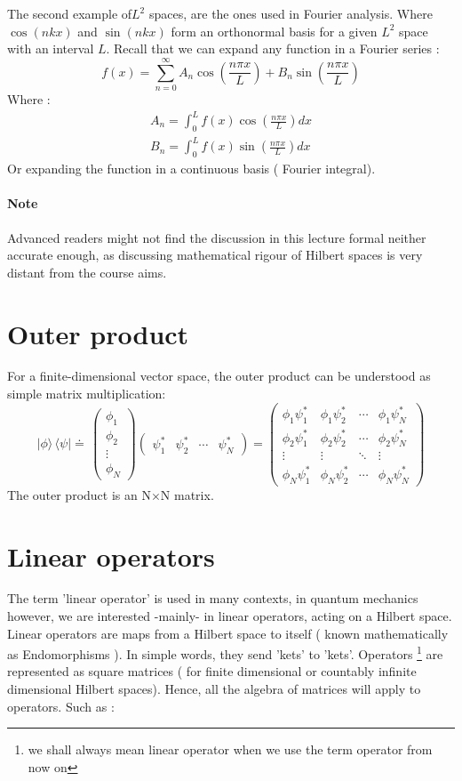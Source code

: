  	    The second example of$L^2$ spaces, are the ones used in Fourier analysis. Where $ \cos(nkx)$ and $ \sin( nkx)$ form an orthonormal basis for a given $L^2$ space with an interval $L$. Recall that we can expand any function in a Fourier series :
 	    \begin{equation}
 	    f(x) = \sum_{n =0} ^{\infty} A_n \cos(\frac{n \pi x}{L}) + B_n \sin(\frac{n \pi x}{L})
 	    \end{equation}
 	    Where :
 	    \begin{align}
 	    A_n = \int_0 ^L f(x) \cos(\frac{n \pi x}{L}) dx \\
 	    B_n = \int_0 ^L f(x) \sin(\frac{n \pi x}{L}) dx
 	    \end{align}
 	    Or expanding the function in a continuous basis ( Fourier integral).
 	   \paragraph{Note}
 	    Advanced readers might not find the discussion in this lecture formal neither accurate enough, as discussing mathematical rigour of Hilbert spaces is very distant from the course aims. 
 \section{ Outer product}
 For a finite-dimensional vector space, the outer product can be understood as simple matrix multiplication:
 \[ |\phi \rangle \, \langle \psi | {\doteq \!\,}
 \begin{pmatrix} \phi_1 \\ \phi_2 \\ \vdots \\ \phi_N \end{pmatrix}
 \begin{pmatrix} \psi_1^* & \psi_2^* & \cdots & \psi_N^* \end{pmatrix}
 = \begin{pmatrix}
 \phi_1 \psi_1^* & \phi_1 \psi_2^* & \cdots & \phi_1 \psi_N^* \\
 \phi_2 \psi_1^* & \phi_2 \psi_2^* & \cdots & \phi_2 \psi_N^* \\
 \vdots & \vdots & \ddots & \vdots \\
 \phi_N \psi_1^* & \phi_N \psi_2^* & \cdots & \phi_N \psi_N^* \end{pmatrix}
 \]
 The outer product is an N$\times$N matrix. 
 \section{Linear operators}
 The term 'linear operator' is used in many contexts, in quantum mechanics however, we are interested -mainly-  in  linear operators, acting on a Hilbert space. Linear operators are maps from a Hilbert space to itself ( known mathematically as Endomorphisms ). In simple words, they send 'kets' to 'kets'. Operators \footnote{ we shall always mean linear operator when we use the term operator from now on} are represented as square matrices ( for finite dimensional or countably infinite dimensional Hilbert spaces). Hence, all the algebra of matrices will apply to operators. Such as :
